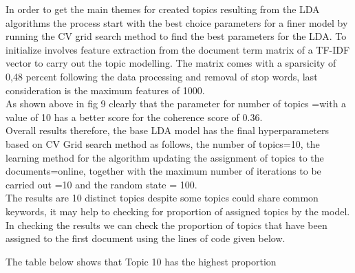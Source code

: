 In order to get the main themes for created topics resulting from the LDA algorithms the process start with the best choice parameters for a finer model by running the CV grid search method to find the best parameters for the LDA.  To initialize  involves feature extraction from the document term matrix of a TF-IDF vector to carry out the topic modelling. The matrix comes with a sparsicity of 0,48 percent following the data processing and removal of stop words, last consideration is the maximum features of 1000.\\
As shown above in fig 9 clearly that the parameter for number of topics =with a value of 10 has a better score for the coherence score of 0.36.\\

Overall results therefore, the base LDA model has the final hyperparameters based on CV Grid search method as follows, the number of topics=10, the learning method for the algorithm updating the assignment of topics to the documents=online, together with the maximum number of iterations to be carried out =10 and the random state = 100.\\
The results are 10 distinct topics despite some topics could share common keywords, it may help to checking for proportion of assigned topics by the model.  In checking the results we can check the proportion of topics that have been assigned to the first document using the lines of code given below.

The table below shows that Topic 10 has the highest proportion


